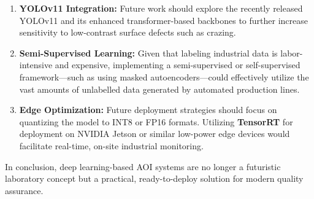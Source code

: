 \begin{enumerate}
    \item \textbf{YOLOv11 Integration:} Future work should explore the recently released YOLOv11 and its enhanced transformer-based backbones to further increase sensitivity to low-contrast surface defects such as crazing.
    
    \item \textbf{Semi-Supervised Learning:} Given that labeling industrial data is labor-intensive and expensive, implementing a semi-supervised or self-supervised framework—such as using masked autoencoders—could effectively utilize the vast amounts of unlabelled data generated by automated production lines.
    
    \item \textbf{Edge Optimization:} Future deployment strategies should focus on quantizing the model to INT8 or FP16 formats. Utilizing \textbf{TensorRT} for deployment on NVIDIA Jetson or similar low-power edge devices would facilitate real-time, on-site industrial monitoring.
\end{enumerate}

In conclusion, deep learning-based AOI systems are no longer a futuristic laboratory concept but a practical, ready-to-deploy solution for modern quality assurance.
